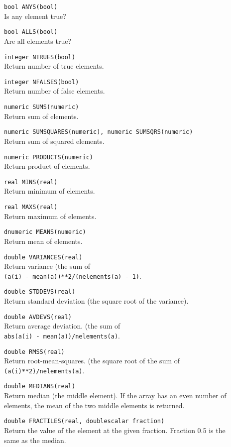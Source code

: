 \begin{description}
  \item[] \texttt{bool ANYS(bool)}\\
    Is any element true?
  \item[] \texttt{bool ALLS(bool)}\\
    Are all elements true?
  \item[] \texttt{integer NTRUES(bool)}\\
    Return number of true elements.
  \item[] \texttt{integer NFALSES(bool)}\\
    Return number of false elements.
  \item[] \texttt{numeric SUMS(numeric)}\\
    Return sum of elements.
  \item[] \texttt{numeric SUMSQUARES(numeric), numeric SUMSQRS(numeric)}\\
    Return sum of squared elements.
  \item[] \texttt{numeric PRODUCTS(numeric)}\\
    Return product of elements.
  \item[] \texttt{real MINS(real)}\\
    Return minimum of elements.
  \item[] \texttt{real MAXS(real)}\\
    Return maximum of elements.
  \item[] \texttt{dnumeric MEANS(numeric)}\\
    Return mean of elements.
  \item[] \texttt{double VARIANCES(real)}\\
    Return variance (the sum of
    \\\texttt{(a(i) - mean(a))**2/(nelements(a) - 1)}.
  \item[] \texttt{double STDDEVS(real)}\\
    Return standard deviation (the square root of the variance).
  \item[] \texttt{double AVDEVS(real)}\\
    Return average deviation. (the sum of 
    \\\texttt{abs(a(i) - mean(a))/nelements(a)}.
  \item[] \texttt{double RMSS(real)}\\
    Return root-mean-squares. (the square root of the sum of
    \\\texttt{(a(i)**2)/nelements(a)}.
  \item[] \texttt{double MEDIANS(real)}\\
    Return median (the middle element).
    If the array has an even number of elements, the mean of
    the two middle elements is returned.
  \item[] \texttt{double FRACTILES(real, doublescalar fraction)}\\
    Return the value of the element at the given fraction.
    Fraction 0.5 is the same as the median.
\end{description}

